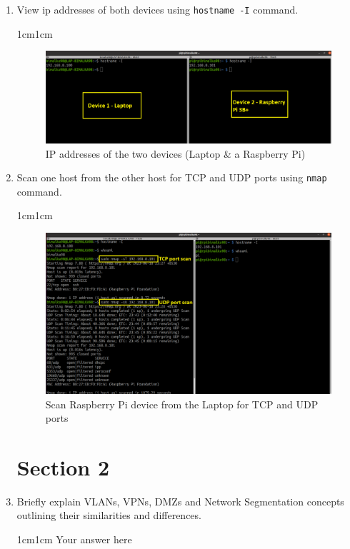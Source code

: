 \documentclass[11pt,letterpaper]{article}
\newenvironment{answer}{\em \color{blue} \begin{adjustwidth}{1cm}{1cm}}{\end{adjustwidth}}
\begin{document}
\begin{enumerate}
		\item View ip addresses of both devices using \texttt{hostname -I} command.
		\begin{answer}
			\begin{figure}[H]
				\centering
				\includegraphics[width=0.9\columnwidth]{images/part3/2.png}
				\caption{IP addresses of the two devices (Laptop \& a Raspberry Pi)}
			\end{figure}
		\end{answer}
		\item Scan one host from the other host for TCP and UDP ports using \texttt{nmap} command.
		\begin{answer}
			\begin{figure}[H]
				\centering
				\includegraphics[width=0.9\columnwidth]{images/part3/4.png}
				\caption{Scan Raspberry Pi device from the Laptop for TCP and UDP ports}
			\end{figure}
		\end{answer}\textbf{}
		
		\section*{Section 2}
		
		
		\item Briefly explain VLANs, VPNs, DMZs and Network Segmentation concepts outlining their similarities and differences.
		
		\begin{answer}
			Your answer here
		\end{answer}
		

\end{enumerate}
\end{document}
